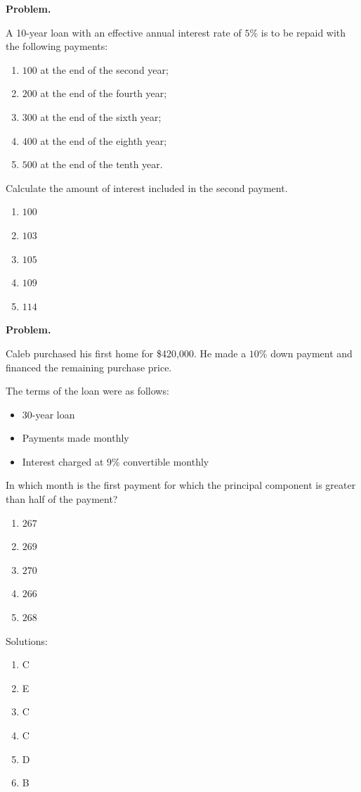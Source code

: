 \documentclass[11pt]{article}
\begin{document}
\textbf{Problem.}

A 10-year loan with an effective annual interest rate of $5\%$ is to be repaid with the following payments:

\begin{enumerate}[label=(\roman*)]
    \item $100$ at the end of the second year;
    \item $200$ at the end of the fourth year;
    \item $300$ at the end of the sixth year;
    \item $400$ at the end of the eighth year;
    \item $500$ at the end of the tenth year.
\end{enumerate}

Calculate the amount of interest included in the second payment.

\begin{enumerate}[label=\Alph*.]
    \item $100$
    \item $103$
    \item $105$
    \item $109$
    \item $114$
\end{enumerate}


\newpage


\textbf{Problem.}

Caleb purchased his first home for \$420{,}000. He made a $10\%$ down payment and financed the remaining purchase price.

The terms of the loan were as follows:

\begin{itemize}
    \item 30-year loan
    \item Payments made monthly
    \item Interest charged at $9\%$ convertible monthly
\end{itemize}

In which month is the first payment for which the principal component is greater than half of the payment?

\begin{enumerate}[label=\Alph*.]
    \item $267$
    \item $269$
    \item $270$
    \item $266$
    \item $268$
\end{enumerate}


\newpage

Solutions:

\begin{enumerate}
    \item C
    \item E
    \item C
    \item C
    \item D
    \item B
\end{enumerate}
\end{document}

